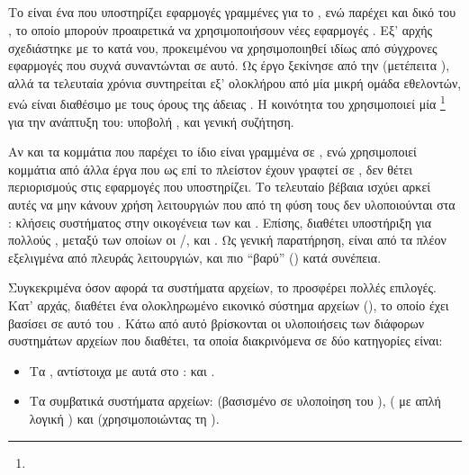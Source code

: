 \subsection{\osv{}}
Το \osv{} είναι ένα  που υποστηρίζει εφαρμογές γραμμένες
για το \linux{}, ενώ παρέχει και δικό του , το οποίο μπορούν
προαιρετικά να χρησιμοποιήσουν νέες εφαρμογές \cite{osv}. Εξ' αρχής σχεδιάστηκε
με το  κατά νου, προκειμένου να χρησιμοποιηθεί ιδίως από σύγχρονες
εφαρμογές που συχνά συναντώνται σε αυτό. Ως έργο ξεκίνησε από την  (μετέπειτα ), αλλά τα τελευταία χρόνια συντηρείται εξ'
ολοκλήρου από μία μικρή ομάδα εθελοντών, ενώ είναι διαθέσιμο με τους όρους της
άδειας . Η κοινότητα του χρησιμοποιεί μία %
\footnote{}
για την ανάπτυξη του: υποβολή ,  και γενική
συζήτηση.

Αν και τα κομμάτια που παρέχει το ίδιο είναι γραμμένα σε , ενώ
χρησιμοποιεί κομμάτια από άλλα έργα που ως επί το πλείστον έχουν γραφτεί σε
, δεν θέτει περιορισμούς στις εφαρμογές που υποστηρίζει. Το
τελευταίο βέβαια ισχύει αρκεί αυτές να μην κάνουν χρήση λειτουργιών που από τη
φύση τους δεν υλοποιούνται στα : κλήσεις συστήματος στην
οικογένεια των \texttt{} και \texttt{}. Επίσης, διαθέτει
υποστήριξη για πολλούς , μεταξύ των οποίων οι \qemu{}/,
 και  \cite{firecracker}.
Ως γενική παρατήρηση, είναι από τα πλέον εξελιγμένα  από πλευράς
λειτουργιών, και πιο ``βαρύ'' () κατά συνέπεια.

Συγκεκριμένα όσον αφορά τα συστήματα αρχείων, το \osv{} προσφέρει πολλές
επιλογές. Κατ' αρχάς, διαθέτει ένα ολοκληρωμένο εικονικό σύστημα αρχείων
(), το οποίο έχει βασίσει σε αυτό του 
\cite{prex}.
Κάτω από αυτό βρίσκονται οι υλοποιήσεις των διάφορων συστημάτων αρχείων που
διαθέτει, τα οποία διακρινόμενα σε δύο κατηγορίες είναι:
\begin{itemize}
    \item Τα , αντίστοιχα με αυτά στο \linux{}:
         και .
    \item Τα συμβατικά συστήματα αρχείων:  (βασισμένο σε υλοποίηση του
        ),  ( με απλή
        λογική ) και  (χρησιμοποιώντας τη 
        \cite{libnfs}).
\end{itemize}

